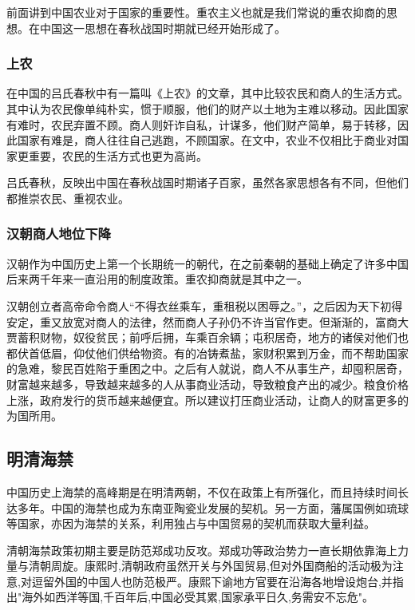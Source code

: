 前面讲到中国农业对于国家的重要性。重农主义也就是我们常说的重农抑商的思想。在中国这一思想在春秋战国时期就已经开始形成了。

\subsubsection{上农}

在中国的吕氏春秋中有一篇叫《上农》的文章，其中比较农民和商人的生活方式。其中认为农民像单纯朴实，惯于顺服，他们的财产以土地为主难以移动。因此国家有难时，农民弃置不顾。商人则奸诈自私，计谋多，他们财产简单，易于转移，因此国家有难是，商人往往自己逃跑，不顾国家。在文中，农业不仅相比于商业对国家更重要，农民的生活方式也更为高尚。

吕氏春秋，反映出中国在春秋战国时期诸子百家，虽然各家思想各有不同，但他们都推崇农民、重视农业。

\subsubsection{汉朝商人地位下降}

汉朝作为中国历史上第一个长期统一的朝代，在之前秦朝的基础上确定了许多中国后来两千年来一直沿用的制度政策。重农抑商就是其中之一。

汉朝创立者高帝命令商人“不得衣丝乘车，重租税以困辱之。”，之后因为天下初得安定，重又放宽对商人的法律，然而商人子孙仍不许当官作吏。但渐渐的，富商大贾蓄积财物，奴役贫民；前呼后拥，车乘百余辆；屯积居奇，地方的诸侯对他们也都伏首低眉，仰仗他们供给物资。有的冶铸煮盐，家财积累到万金，而不帮助国家的急难，黎民百姓陷于重困之中。之后有人就说，商人不从事生产，却囤积居奇，财富越来越多，导致越来越多的人从事商业活动，导致粮食产出的减少。粮食价格上涨，政府发行的货币越来越便宜。所以建议打压商业活动，让商人的财富更多的为国所用。

\subsection{明清海禁}

中国历史上海禁的高峰期是在明清两朝，不仅在政策上有所强化，而且持续时间长达多年。中国的海禁也成为东南亚陶瓷业发展的契机。另一方面，藩属国例如琉球等国家，亦因为海禁的关系，利用独占与中国贸易的契机而获取大量利益。

清朝海禁政策初期主要是防范郑成功反攻。郑成功等政治势力一直长期依靠海上力量与清朝周旋。康熙时,清朝政府虽然开关与外国贸易,但对外国商船的活动极为注意,对逗留外国的中国人也防范极严。康熙下谕地方官要在沿海各地增设炮台,并指出"海外如西洋等国,千百年后,中国必受其累,国家承平日久,务需安不忘危"。
